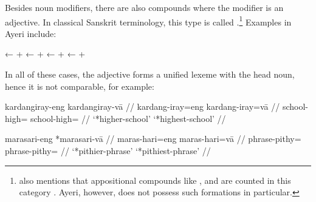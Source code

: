 Besides noun modifiers, there are also compounds where the modifier is an 
adjective. In classical Sanskrit terminology, this type is called 
 \citep[698--699]{bauer2001}.\footnote{\citeauthor{bauer2001} 
also mentions that appositional compounds like ,  and  are counted in this category 
\citep[699]{bauer2001}. Ayeri, however, does not possess such formations in 
particular.} Examples in Ayeri include:%

\pex
	\a {}
		← 
		+ 
	\a {}
		← 
		+ 
	\a {}
		← 
		+ 
	\a {}
		← 
		+ 
\xe

In all of these cases, the adjective forms a unified lexeme with the head noun, 
hence it is not comparable, for example:

\pex
\a\begingl
	\gla *kardangiray-eng \quad{} kardangiray-vā //
	\glb kardang-iray=eng \quad{} kardang-iray=vā //
	\glc school-high=\Comp{} \quad{} school-high=\Supl{} //
	\glft `*higher-school' {} `*highest-school' //
\endgl

\a\begingl
	\gla *marasari-eng \quad{} *marasari-vā //
	\glb maras-hari=eng \quad{} maras-hari=vā //
	\glc phrase-pithy=\Comp{} \quad{} phrase-pithy=\Supl{} //
	\glft `*pithier-phrase' {} `*pithiest-phrase' //
\endgl

\xe

